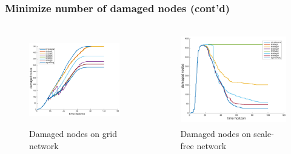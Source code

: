 \documentclass{beamer}
\begin{document}
\begin{frame}
	\frametitle{Minimize number of damaged nodes (cont'd)}
	\begin{columns}
		\begin{column}{0.5\textwidth}
		\begin{figure}
			\centering
			\includegraphics[height=40mm]{./figs/Grid_damaged_small.pdf}
			\caption{Damaged nodes on grid network}
			\label{fig:opt_on_grid}
		\end{figure}
		\end{column}

		\begin{column}{0.5\textwidth}
		\begin{figure}
			\centering
			\includegraphics[height=40mm]{./figs/SF_damaged_small.pdf}
			\caption{Damaged nodes on scale-free network}
			\label{fig:opt_on_scalefree}
		\end{figure}
		\end{column}
	\end{columns}

	
\end{frame}
\end{document}

